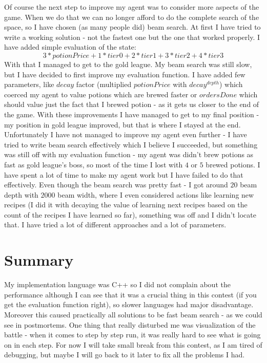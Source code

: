 \documentclass[11pt]{article}
\begin{document}
	Of course the next step to improve my agent was to consider more aspects of the game. When we do that we can no longer afford to do the complete search of the space, so I have chosen (as many people did) beam search. At first I have tried to write a working solution - not the fastest one but the one that worked properly. I have added simple evaluation of the state:
	\begin{equation}
		3 * potionPrice + 1 * tier0 + 2 * tier1 + 3 * tier2 + 4 * tier3
	\end{equation}
	With that I managed to get to the gold league. My beam search was still slow, but I have decided to first improve my evaluation function. I have added few parameters, like $decay$  factor (multiplied $potionPrice$ with $decay^{depth}$) which coerced my agent to value potions which are brewed faster or $ordersDone$ which should value just the fact that I brewed potion - as it gets us closer to the end of the game. With these improvements I have managed to get to my final position - my position in gold league improved, but that is where I stayed at the end. Unfortunately I have not managed to improve my agent even further - I have tried to write beam search effectively which I believe I succeeded, but something was still off with my evaluation function - my agent was didn't brew potions as fast as gold league's boss, so most of the time I lost with $4$ or $5$ brewed potions. I have spent a lot of time to make my agent work but I have failed to do that effectively. Even though the beam search was pretty fast - I got around $20$ beam depth with $2000$ beam width, where I even considered actions like learning new recipes (I did it with decaying the value of learning next recipes based on the count of the recipes I have learned so far), something was off and I didn't locate that. I have tried a lot of different approaches and a lot of parameters.
	
	\section{Summary}
	
	My implementation language was C++ so I did not complain about the performance although I can see that it was a crucial thing in this contest (if you get the evaluation function right), so slower languages had major disadvantage. Moreover this caused practically all solutions to be fast beam search - as we could see in postmortems. One thing that really disturbed me was visualization of the battle - when it comes to step by step run, it was really hard to see what is going on in each step. For now I will take small break from this contest, as I am tired of debugging, but maybe I will go back to it later to fix all the problems I had.
	
\end{document}
